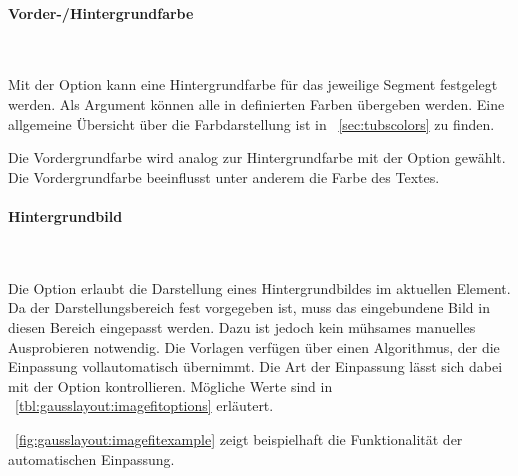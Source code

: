 \paragraph{Vorder-/Hintergrundfarbe}\hfill

\begin{Declaration}
  \\
\end{Declaration}

Mit der Option  kann eine Hintergrundfarbe für das
jeweilige Segment festgelegt werden. Als Argument können alle in \tubslatex
definierten Farben übergeben werden.
Eine allgemeine Übersicht über die Farbdarstellung ist in
\chaptername~\ref{sec:tubscolors} zu finden.

Die Vordergrundfarbe wird analog zur Hintergrundfarbe mit der
Option  gewählt.
Die Vordergrundfarbe beeinflusst unter anderem die Farbe des Textes.


\paragraph{Hintergrundbild}\hfill

\begin{Declaration}
  \\
\end{Declaration}

Die Option  erlaubt die Darstellung
eines Hintergrundbildes im aktuellen Element.
Da der Darstellungsbereich fest vorgegeben ist, muss das eingebundene Bild
in diesen Bereich eingepasst werden.
Dazu ist jedoch kein mühsames manuelles Ausprobieren notwendig.
Die Vorlagen verfügen über einen Algorithmus, der die Einpassung vollautomatisch
übernimmt.
Die Art der Einpassung lässt sich dabei mit der Option  kontrollieren.
%
Mögliche Werte sind in \tablename~\ref{tbl:gausslayout:imagefitoptions} erläutert.

\figurename~\ref{fig:gausslayout:imagefitexample} zeigt beispielhaft die Funktionalität
der automatischen Einpassung.

